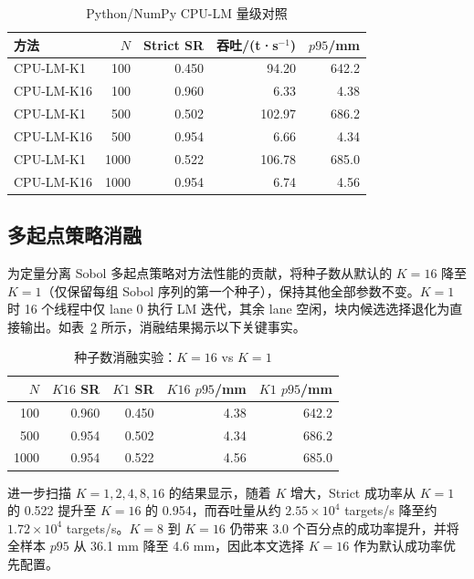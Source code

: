 \documentclass[twocolumn,a4paper,10pt]{ctexart}
\begin{document}
\begin{table}[htbp]
\centering
\caption{Python/NumPy CPU-LM 量级对照}
\label{tab:cpu}
\scriptsize
\setlength{\tabcolsep}{3pt}
\begin{tabular}{lrrrr}
\toprule
方法 & $N$ & Strict SR & 吞吐/(t·s$^{-1}$) & $p95$/mm\\
\midrule
CPU-LM-K1  & 100  & 0.450 & 94.20  & 642.2\\
CPU-LM-K16 & 100  & 0.960 & 6.33   & 4.38\\
CPU-LM-K1  & 500  & 0.502 & 102.97 & 686.2\\
CPU-LM-K16 & 500  & 0.954 & 6.66   & 4.34\\
CPU-LM-K1  & 1000 & 0.522 & 106.78 & 685.0\\
CPU-LM-K16 & 1000 & 0.954 & 6.74   & 4.56\\
\bottomrule
\end{tabular}
\end{table}

\subsection{多起点策略消融}

为定量分离 Sobol 多起点策略对方法性能的贡献，将种子数从默认的 $K=16$ 降至 $K=1$（仅保留每组 Sobol 序列的第一个种子），保持其他全部参数不变。$K=1$ 时 16 个线程中仅 lane 0 执行 LM 迭代，其余 lane 空闲，块内候选选择退化为直接输出。如表~\ref{tab:ablation} 所示，消融结果揭示以下关键事实。

\begin{table}[htbp]
\centering
\caption{种子数消融实验：$K=16$ vs $K=1$}
\label{tab:ablation}
\scriptsize
\setlength{\tabcolsep}{3pt}
\begin{tabular}{rrrrr}
\toprule
$N$ & $K16$ SR & $K1$ SR & $K16$ $p95$/mm & $K1$ $p95$/mm\\
\midrule
100  & 0.960 & 0.450 & 4.38  & 642.2\\
500  & 0.954 & 0.502 & 4.34  & 686.2\\
1000 & 0.954 & 0.522 & 4.56  & 685.0\\
\bottomrule
\end{tabular}
\end{table}

进一步扫描 $K=1,2,4,8,16$ 的结果显示，随着 $K$ 增大，Strict 成功率从 $K=1$ 的 0.522 提升至 $K=16$ 的 0.954，而吞吐量从约 $2.55\times10^4$ targets/s 降至约 $1.72\times10^4$ targets/s。$K=8$ 到 $K=16$ 仍带来 3.0 个百分点的成功率提升，并将全样本 $p95$ 从 36.1 mm 降至 4.6 mm，因此本文选择 $K=16$ 作为默认成功率优先配置。
\end{document}
